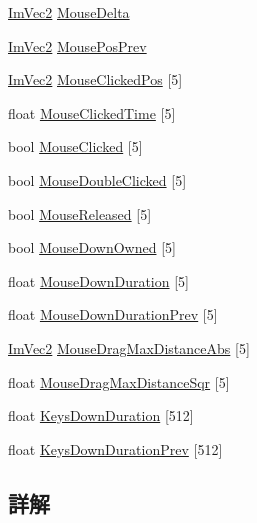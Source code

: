 \begin{DoxyCompactItemize}
\item 
\mbox{\hyperlink{struct_im_vec2}{Im\+Vec2}} \mbox{\hyperlink{struct_im_gui_i_o_a5b5cc0c171104337e3e7e13a8f7b0938}{Mouse\+Delta}}
\item 
\mbox{\hyperlink{struct_im_vec2}{Im\+Vec2}} \mbox{\hyperlink{struct_im_gui_i_o_a0fa6601a709eb9e34460e6abc7e77ad7}{Mouse\+Pos\+Prev}}
\item 
\mbox{\hyperlink{struct_im_vec2}{Im\+Vec2}} \mbox{\hyperlink{struct_im_gui_i_o_a23c9c6c48a51774fee36b7f0bb75d331}{Mouse\+Clicked\+Pos}} \mbox{[}5\mbox{]}
\item 
float \mbox{\hyperlink{struct_im_gui_i_o_a729a9ddda54b9f7d7d640340d56e981b}{Mouse\+Clicked\+Time}} \mbox{[}5\mbox{]}
\item 
bool \mbox{\hyperlink{struct_im_gui_i_o_a8655587202ff9001e5b0ccc6ade42d93}{Mouse\+Clicked}} \mbox{[}5\mbox{]}
\item 
bool \mbox{\hyperlink{struct_im_gui_i_o_a8bc01048733dc554de3d03f40f57b9ca}{Mouse\+Double\+Clicked}} \mbox{[}5\mbox{]}
\item 
bool \mbox{\hyperlink{struct_im_gui_i_o_a3a2e7d52289eecfdbe8571e034e41b53}{Mouse\+Released}} \mbox{[}5\mbox{]}
\item 
bool \mbox{\hyperlink{struct_im_gui_i_o_a682f98d817f99058136cb47cf8a9bcc3}{Mouse\+Down\+Owned}} \mbox{[}5\mbox{]}
\item 
float \mbox{\hyperlink{struct_im_gui_i_o_ab464bf317051bbdf1c93ab36802fe3b7}{Mouse\+Down\+Duration}} \mbox{[}5\mbox{]}
\item 
float \mbox{\hyperlink{struct_im_gui_i_o_a59d19cf7ad831e57ce15f90295871881}{Mouse\+Down\+Duration\+Prev}} \mbox{[}5\mbox{]}
\item 
\mbox{\hyperlink{struct_im_vec2}{Im\+Vec2}} \mbox{\hyperlink{struct_im_gui_i_o_a402bca8838011fc4518c0895f24ffc92}{Mouse\+Drag\+Max\+Distance\+Abs}} \mbox{[}5\mbox{]}
\item 
float \mbox{\hyperlink{struct_im_gui_i_o_a86c7fe77349fd82a60ab7a279aa27f01}{Mouse\+Drag\+Max\+Distance\+Sqr}} \mbox{[}5\mbox{]}
\item 
float \mbox{\hyperlink{struct_im_gui_i_o_a6f1da2ea6d8e3398d9526fe983cf0a6f}{Keys\+Down\+Duration}} \mbox{[}512\mbox{]}
\item 
float \mbox{\hyperlink{struct_im_gui_i_o_ac079dcd415784a08fec74388e18abb97}{Keys\+Down\+Duration\+Prev}} \mbox{[}512\mbox{]}
\end{DoxyCompactItemize}


\subsection{詳解}


